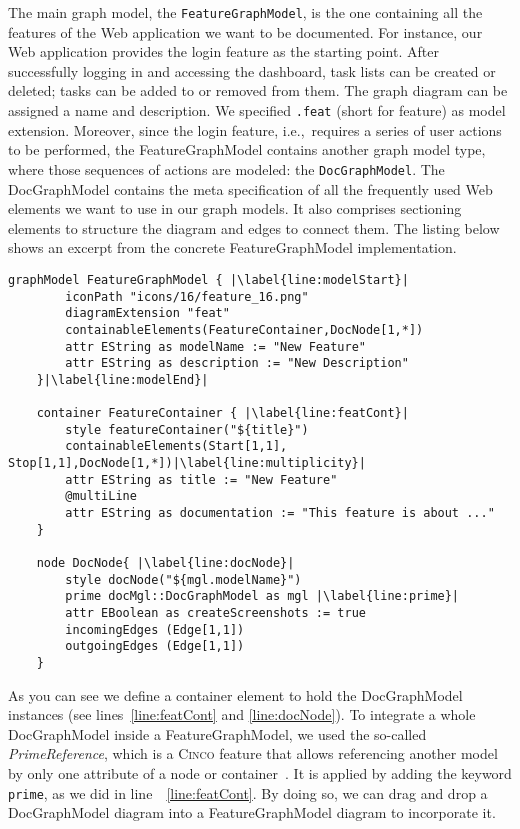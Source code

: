 The main graph model, the \lstinline{FeatureGraphModel}, is the one containing all the features of the Web application we want to be documented. For instance, our  Web application provides the login feature as the starting point. After successfully logging in and accessing the dashboard, task lists can be created or deleted; tasks can be added to or removed from them. The graph diagram can be assigned a name and description. We specified \lstinline{.feat} (short for feature) as model extension. Moreover, since the login feature, i.e.,~requires a series of user actions to be performed, the FeatureGraphModel contains another graph model type, where those sequences of actions are modeled: the \lstinline{DocGraphModel}. The DocGraphModel contains the meta specification of all the frequently used Web elements we want to use in our graph models. It also comprises sectioning elements to structure the diagram and edges to connect them. The listing below shows an excerpt from the concrete FeatureGraphModel implementation.

\begin{lstlisting}[language=MGL, caption={Excerpt from the feature.mgl, meta-specification of the FeatureGraphModel}, label=docMGL, escapechar=|]
    graphModel FeatureGraphModel { |\label{line:modelStart}|
        iconPath "icons/16/feature_16.png"
        diagramExtension "feat"
        containableElements(FeatureContainer,DocNode[1,*])
        attr EString as modelName := "New Feature"
        attr EString as description := "New Description"
    }|\label{line:modelEnd}|
    
    container FeatureContainer { |\label{line:featCont}|
        style featureContainer("${title}")
        containableElements(Start[1,1], Stop[1,1],DocNode[1,*])|\label{line:multiplicity}|
        attr EString as title := "New Feature"
        @multiLine
        attr EString as documentation := "This feature is about ..."
    }
    
    node DocNode{ |\label{line:docNode}|
        style docNode("${mgl.modelName}")
        prime docMgl::DocGraphModel as mgl |\label{line:prime}|
        attr EBoolean as createScreenshots := true
        incomingEdges (Edge[1,1])
        outgoingEdges (Edge[1,1])
    }
\end{lstlisting}

As you can see we define a container element to hold the DocGraphModel instances (see lines~\ref{line:featCont} and \ref{line:docNode}). To integrate a whole DocGraphModel inside a FeatureGraphModel, we used the so-called \textit{PrimeReference}, which is a \textsc{Cinco} feature that allows referencing another model by only one attribute of a node or container~\cite{Cinco}. It is applied by adding the keyword \lstinline[language=MGL]{prime}, as we did in line~~\ref{line:featCont}. By doing so, we can drag and drop a DocGraphModel diagram into a FeatureGraphModel diagram to incorporate it.

